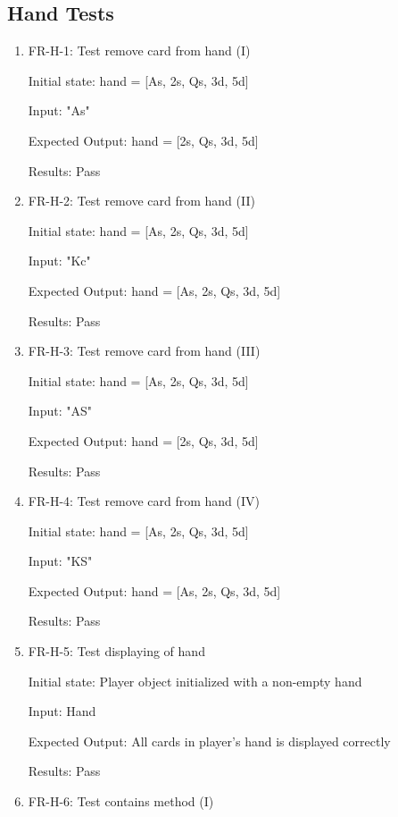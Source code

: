 \documentclass[12pt, titlepage]{article}
\begin{document}
\subsection{Hand Tests}
\begin{enumerate}
    \item FR-H-1: Test remove card from hand (I)
    
    Initial state: hand = [As, 2s, Qs, 3d, 5d]
    
    Input: "As"
    
    Expected Output: hand = [2s, Qs, 3d, 5d]
    
    Results: Pass
    
    \item FR-H-2: Test remove card from hand (II)
    
    Initial state: hand = [As, 2s, Qs, 3d, 5d]
    
    Input: "Kc"
    
    Expected Output: hand = [As, 2s, Qs, 3d, 5d]
    
    Results: Pass
    
    \item FR-H-3: Test remove card from hand (III)
    
    Initial state: hand = [As, 2s, Qs, 3d, 5d]
    
    Input: "AS"
    
    Expected Output: hand = [2s, Qs, 3d, 5d]
    
    Results: Pass
    
    \item FR-H-4: Test remove card from hand (IV)
    
    Initial state: hand = [As, 2s, Qs, 3d, 5d]
    
    Input: "KS"
    
    Expected Output: hand = [As, 2s, Qs, 3d, 5d]
    
    Results: Pass
    
    \item FR-H-5: Test displaying of hand
    
    Initial state: Player object initialized with a non-empty hand
    
    Input: Hand
    
    Expected Output: All cards in player's hand is displayed correctly
    
    Results: Pass
    
    \item FR-H-6: Test contains method (I)
    

\end{enumerate}
\end{document}
